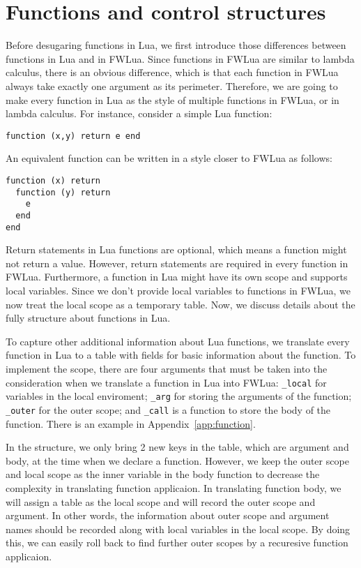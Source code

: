 \section{Functions and control structures}\label{sec:TraFunc}
Before desugaring functions in Lua, we first introduce those differences between functions in Lua and in FWLua. Since functions in FWLua are similar to lambda calculus, there is an obvious difference, which is that each function in FWLua always take exactly one argument as its perimeter. Therefore, we are going to make every function in Lua as the style of multiple functions in FWLua, or in lambda calculus. For instance, consider a simple Lua function:

\begin{verbatim}
function (x,y) return e end
\end{verbatim}

An equivalent function can be written in a style closer to FWLua as follows:

\begin{verbatim}
function (x) return 
  function (y) return 
    e
  end
end
\end{verbatim}


Return statements in Lua functions are optional, which means a function might not return a value. However, return statements are required in every function in FWLua.
Furthermore, a function in Lua might have its own scope and supports local variables. 
Since we don't provide local variables to functions in FWLua, we now treat the local scope as a temporary table.
Now, we discuss details about the fully structure about functions in Lua.

To capture other additional information about Lua functions,
we translate every function in Lua to a table with fields for basic information about the function. To implement the scope, there are four arguments that must be taken into the consideration when we translate a function in Lua into FWLua: {\tt \_local} for variables in the local enviroment; {\tt \_arg} for storing the arguments of the function; {\tt \_outer} for the  outer scope; and {\tt \_call} is a function to store the body of the function. There is an example in Appendix~\ref{app:function}.

In the structure, we only bring 2 new keys in the table, which are argument and body, at the time when we declare a function. However, we keep the outer scope and local scope as the inner variable in the body function to decrease the complexity in translating function applicaion. In translating function body, we will assign a table as the local scope and will record the outer scope and argument. In other words, the information about outer scope and argument names should be recorded along with local variables in the local scope. By doing this, we can easily roll back to find further outer scopes by a recuresive function applicaion.

